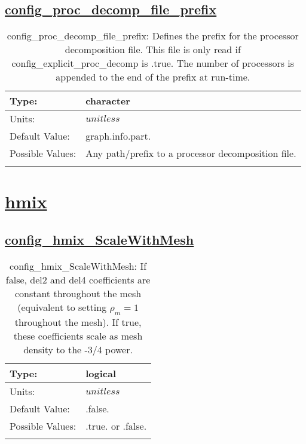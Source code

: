 \subsection[config\_proc\_decomp\_file\_prefix]{\hyperref[sec:nm_tab_decomposition]{config\_proc\_decomp\_file\_prefix}}
\label{subsec:nm_sec_config_proc_decomp_file_prefix}
\begin{center}
\begin{longtable}{| p{2.0in} | p{4.0in} |}
    \hline
    Type: & character \\
    \hline
    Units: & $unitless$ \\
    \hline
    Default Value: & graph.info.part. \\
    \hline
    Possible Values: & Any path/prefix to a processor decomposition file. \\
    \hline
    \caption{config\_proc\_decomp\_file\_prefix: Defines the prefix for the processor decomposition file. This file is only read if config\_explicit\_proc\_decomp is .true. The number of processors is appended to the end of the prefix at run-time.}
\end{longtable}
\end{center}
\section[hmix]{\hyperref[sec:nm_tab_hmix]{hmix}}
\label{sec:nm_sec_hmix}
\subsection[config\_hmix\_ScaleWithMesh]{\hyperref[sec:nm_tab_hmix]{config\_hmix\_ScaleWithMesh}}
\label{subsec:nm_sec_config_hmix_ScaleWithMesh}
\begin{center}
\begin{longtable}{| p{2.0in} | p{4.0in} |}
    \hline
    Type: & logical \\
    \hline
    Units: & $unitless$ \\
    \hline
    Default Value: & .false. \\
    \hline
    Possible Values: & .true. or .false. \\
    \hline
    \caption{config\_hmix\_ScaleWithMesh:  If false, del2 and del4 coefficients are constant throughout the mesh (equivalent to setting  $\rho_m=1$  throughout the mesh).  If true, these coefficients scale as mesh density to the -3/4 power.}
\end{longtable}
\end{center}
